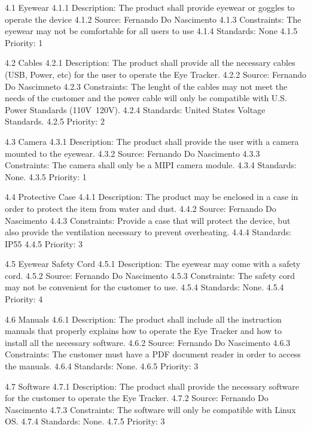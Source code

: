4.1 Eyewear
	4.1.1 Description: The product shall provide eyewear or goggles to operate the device
	4.1.2 Source: Fernando Do Nascimento
	4.1.3 Constraints: The eyewear may not be comfortable for all users to use
	4.1.4 Standards: None
	4.1.5 Priority: 1

4.2 Cables
	4.2.1 Description: The product shall provide all the necessary cables (USB, Power, etc) for the user to operate the Eye Tracker.
	4.2.2 Source: Fernando Do Nascimneto
	4.2.3 Constraints: The lenght of the cables may not meet the needs of the customer and the power cable will only be compatible with U.S. Power Standards (110V~120V).
	4.2.4 Standards: United States Voltage Standards.
	4.2.5 Priority: 2
	
4.3 Camera
	4.3.1 Description: The product shall provide the user with a camera mounted to the eyewear.
	4.3.2 Source: Fernando Do Nascimento
	4.3.3 Constraints: The camera shall only be a MIPI camera module.
	4.3.4 Standards: None.
	4.3.5 Priority: 1
	
4.4 Protective Case
	4.4.1 Description: The product may be enclosed in a case in order to protect the item from water and dust.
	4.4.2 Source: Fernando Do Nascimento
	4.4.3 Constraints: Provide a case that will protect the device, but also provide the ventilation necessary to prevent overheating.
	4.4.4 Standards: IP55
	4.4.5 Priority: 3
	
4.5 Eyewear Safety Cord
	4.5.1 Description: The eyewear may come with a safety cord.
	4.5.2 Source: Fernando Do Nascimento
	4.5.3 Constraints: The safety cord may not be convenient for the customer to use.
	4.5.4 Standards: None.
	4.5.4 Priority: 4
	
4.6 Manuals
	4.6.1 Description: The product shall include all the instruction manuals that properly explains how to operate the Eye Tracker and how to install all the necessary software.
	4.6.2 Source: Fernando Do Nascimento
	4.6.3 Constraints: The customer must have a PDF document reader in order to access the manuals.
	4.6.4 Standards: None.
	4.6.5 Priority: 3

4.7 Software
	4.7.1 Description: The product shall provide the necessary software for the customer to operate the Eye Tracker.
	4.7.2 Source: Fernando Do Nascimento
	4.7.3 Constraints: The software will only be compatible with Linux OS.
	4.7.4 Standards: None.
	4.7.5 Priority: 3